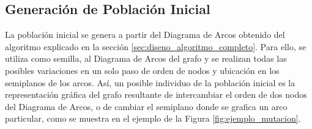 	\subsection{Generación de Población Inicial}
	\label{subsec:generar_poblacion_inicial}
	La población inicial se genera a partir del Diagrama de Arcos obtenido del algoritmo explicado en la sección \ref{sec:diseno_algoritmo_completo}. 
	Para ello, se utiliza como semilla, al Diagrama de Arcos del  grafo  y  se realizan todas las posibles variaciones en un solo paso de orden de nodos y ubicación en los semiplanos de los arcos. Así, un posible individuo de la población inicial es la representación gráfica del grafo resultante de intercambiar el orden de dos nodos del Diagrama de Arcos, o de cambiar el semiplano donde se grafica  un arco particular, como se muestra en el ejemplo de la Figura \ref{fig:ejemplo_mutacion}.
